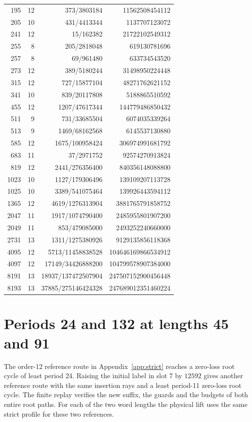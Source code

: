 \documentclass[11pt,reqno]{amsart}
\theoremstyle{remark}
\begin{document}
\begin{longtable}{@{}rrrr@{}}
195 & 12 & 373/3803184 & 11562508454112 \\
205 & 10 & 431/4413344 & 1137707123072 \\
241 & 12 & 15/162382 & 21722102549312 \\
255 & 8 & 205/2818048 & 619130781696 \\
257 & 8 & 69/961480 & 633734543520 \\
273 & 12 & 389/5180244 & 31498950224448 \\
315 & 12 & 727/15877104 & 48271762621152 \\
341 & 10 & 839/20117808 & 5188865510592 \\
455 & 12 & 1207/47617344 & 144779486850432 \\
511 & 9 & 731/33685504 & 6074035339264 \\
513 & 9 & 1469/68162568 & 6145537130880 \\
585 & 12 & 1675/100958424 & 306974991681792 \\
683 & 11 & 37/2971752 & 92574270913824 \\
819 & 12 & 2441/276356400 & 840356148088800 \\
1023 & 10 & 1127/179306496 & 139109207113728 \\
1025 & 10 & 3389/541075464 & 139926443594112 \\
1365 & 12 & 4619/1276313904 & 3881765791858752 \\
2047 & 11 & 1917/1074790400 & 2485955801907200 \\
2049 & 11 & 853/479085000 & 2493252240660000 \\
2731 & 13 & 1311/1275380926 & 9129135856118368 \\
4095 & 12 & 5713/11458838528 & 104646169866534912 \\
4097 & 12 & 17149/34426888200 & 104799578907384000 \\
8191 & 13 & 18937/137472507904 & 247507152900456448 \\
8193 & 13 & 37885/275146424328 & 247689012351460224 \\
\end{longtable}


\section{Periods 24 and 132 at lengths 45 and 91}\label{sec:coexist}

The order-12 reference route in Appendix~\ref{app:strict}
reaches a zero-loss root cycle of least period 24. Raising
the initial label in slot 7 by \(12592\) gives another reference
route with the same insertion rays and a least period-11
zero-loss root cycle. The finite replay verifies the new
suffix, the guards and the budgets of both entire root paths.
For each of the two word lengths the physical lift uses the
same strict profile for these two references.
\end{document}
